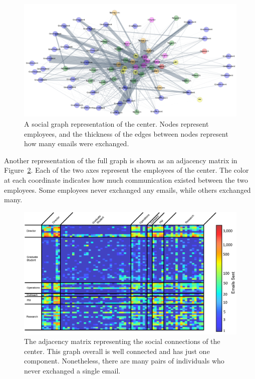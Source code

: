 \documentclass[12pt]{report}
\begin{document}
\begin{figure}[t]
    \centering
    \includegraphics[width=\columnwidth,trim={0mm 0mm 0mm 0mm},clip]{color_social_network}
    \vspace{-17pt}
    \caption[The social network of the center]{A social graph representation of the center.  Nodes represent employees, and the thickness of the edges between nodes represent how many emails were exchanged.}
    \label{fig:social_net}
\end{figure}

Another representation of the full graph is shown as an adjacency matrix in Figure~\ref{fig:adj_matrix}.
Each of the two axes represent the employees of the center.
The color at each coordinate indicates how much communication existed between the two employees.
Some employees never exchanged any emails, while others exchanged many.

\begin{figure}[t]
    \centering
    \includegraphics[width=\columnwidth,trim={4mm .5mm 0mm 5mm},clip]{JetEdit}
    \vspace{-17pt}
    \caption[The dataset represented as an adjacency matrix]{The adjacency matrix representing the social connections of the center.  This graph overall is well connected and has just one component.  Nonetheless, there are many pairs of individuals who never exchanged a single email.}
    \label{fig:adj_matrix}
\end{figure}
\end{document}
